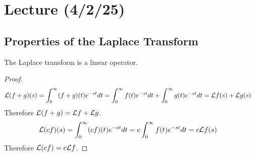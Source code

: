 \documentclass[notes]{subfiles}
\begin{document}
\setcounter{section}{17}
\section{Lecture (4/2/25)}

\subsection{Properties of the Laplace Transform}
\begin{lemma}
    The Laplace transform is a linear operator.
\end{lemma}
\begin{proof}
    \begin{align*}
        \mathcal{L} (f + g)(s)
        &= \int_0^\infty (f + g)(t)e^{-st}dt
        = \int_0^\infty f(t)e^{-st}dt + \int_0^\infty g(t)e^{-st}dt
        = \mathcal{L} f(s) + \mathcal{L} g(s)
    \end{align*}
    Therefore $\mathcal{L} (f + g) = \mathcal{L} f + \mathcal{L} g$.
    \begin{align*}
        \mathcal{L} (cf)(s)
        &= \int_0^\infty (cf)(t)e^{-st}dt
        = c\int_0^\infty f(t)e^{-st}dt
        = c\mathcal{L} f(s)
    \end{align*}
    Therefore $\mathcal{L} (cf) = c\mathcal{L} f$.
\end{proof}
\end{document}

